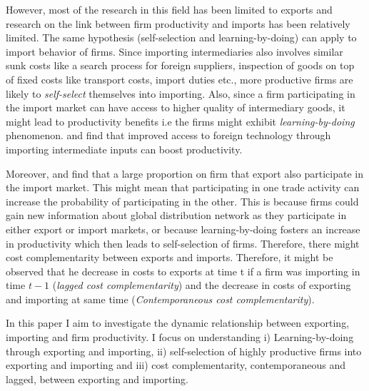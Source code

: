 \documentclass[12pt]{article}
\begin{document}



However, most of the research in this field has been limited to
exports and research on the link between firm productivity and imports has been relatively limited. The same hypothesis (self-selection and learning-by-doing) can  apply
to import behavior of firms. Since importing intermediaries also
involves  
similar sunk costs like  a search process for foreign suppliers,
inspection of goods on top of fixed costs like  transport costs, import duties
etc., more productive firms are likely to \textit{self-select} themselves
into importing. Also, since a firm
participating in the import market can have access to higher quality
of intermediary goods, it might lead to productivity benefits
i.e the firms might exhibit \textit{learning-by-doing} phenomenon. 
\textcite{topalova2011trade}  and \textcite{halpern2011imported}
find that improved access to foreign technology through importing
intermediate inputs can boost productivity. 

Moreover, \textcite{muuls2009imports} and \textcite{aristei2013firms} find that
a large proportion on firm that export also participate in the import
market. This might mean that participating in one trade activity can increase the probability of
participating in the other. This is
because  firms could gain new information about global distribution
network as they participate in either export or import markets, or
because learning-by-doing fosters an increase in productivity which
then leads to self-selection of firms. Therefore, there might cost
complementarity between exports and imports. Therefore, it might be
observed that he decrease in costs to
exports at time t if a firm was importing in time $t-1$
(\textit{lagged cost complementarity}) and the decrease in costs 
of exporting and importing at same time 
(\textit{Contemporaneous cost complementarity}).  

In this paper I aim to investigate the dynamic relationship between
exporting, importing and firm productivity. I focus on understanding 
i) Learning-by-doing through exporting and importing, ii)
self-selection of highly productive firms into exporting and importing
and iii) cost
complementarity, contemporaneous and lagged, between exporting and
importing. 
\end{document}
